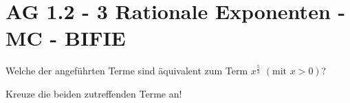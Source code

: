 \section{AG 1.2 - 3 Rationale Exponenten - MC - BIFIE}

\begin{beispiel}[AG 1.2]{1} %
		Welche der angeführten Terme sind äquivalent zum Term $x^{\frac{5}{3}}$ $\left( \text{mit } x>0 \right)$?
			
			Kreuze die beiden zutreffenden Terme an!
\end{beispiel}